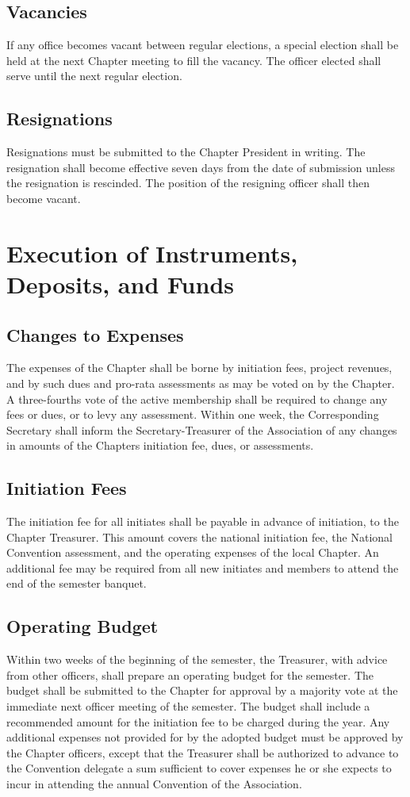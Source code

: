 \documentclass{article}
\begin{document}
	\subsection{Vacancies}
	If any office becomes vacant between regular elections, a special election shall be held at the next Chapter meeting to fill the vacancy. The officer elected shall serve until the next regular election.
	
	\subsection{Resignations}
	Resignations must be submitted to the Chapter President in writing. The resignation shall become effective seven days from the date of submission unless the resignation is rescinded. The position of the resigning officer shall then become vacant.
	
	\section{Execution of Instruments, Deposits, and Funds}
	\subsection{Changes to Expenses}
	The expenses of the Chapter shall be borne by initiation fees, project revenues, and by such dues and pro-rata assessments as may be voted on by the Chapter. A three-fourths vote of the active membership shall be required to change any fees or dues, or to levy any assessment. Within one week, the Corresponding Secretary shall inform the Secretary-Treasurer of the Association of any changes in amounts of the Chapter\textquotesingle s initiation fee, dues, or assessments.
	\subsection{Initiation Fees}
	The initiation fee for all initiates shall be payable in advance of initiation, to the Chapter Treasurer. This amount covers the national initiation fee, the National Convention assessment, and the operating expenses of the local Chapter. An additional fee may be required from all new initiates and members to attend the end of the semester banquet.
	\subsection{Operating Budget}
	Within two weeks of the beginning of the semester, the Treasurer, with advice from other officers, shall prepare an operating budget for the semester. The budget shall be submitted to the Chapter for approval by a majority vote at the immediate next officer meeting of the semester. The budget shall include a recommended amount for the initiation fee to be charged during the year. Any additional expenses not provided for by the adopted budget must be approved by the Chapter officers, except that the Treasurer shall be authorized to advance to the Convention delegate a sum sufficient to cover expenses he or she expects to incur in attending the annual Convention of the Association.
	
\end{document}
